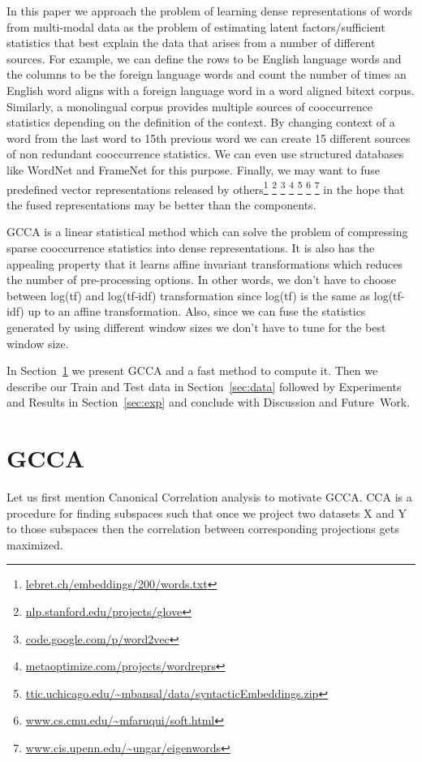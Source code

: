 \documentclass[11pt]{article}
\begin{document}
In this paper we approach the problem of learning dense
representations of words from multi-modal data as the
problem of estimating latent factors/sufficient statistics that best
explain the
data that arises from a number of different
sources. For example, we can define the rows to be English language words
and the columns to be the foreign language words and
count the number of times an English word aligns with a
foreign language word in a word aligned bitext corpus. Similarly,
a monolingual corpus provides multiple sources of 
cooccurrence statistics depending on the definition of the
context. By changing context of a word from the last word to 15th
previous word we can
create 15 different sources of non redundant cooccurrence
statistics. We can even use structured databases like WordNet and
FrameNet for this purpose. Finally, we may want to fuse predefined vector
representations released by others\footnote{\url{lebret.ch/embeddings/200/words.txt}}
  \footnote{\url{nlp.stanford.edu/projects/glove}}
  \footnote{\url{code.google.com/p/word2vec}}
  \footnote{\url{metaoptimize.com/projects/wordreprs}}
  \footnote{\url{ttic.uchicago.edu/~mbansal/data/syntacticEmbeddings.zip}}
  \footnote{\url{www.cs.cmu.edu/~mfaruqui/soft.html}}
  \footnote{\url{www.cis.upenn.edu/~ungar/eigenwords}}
  in the hope that the fused representations may be better
than the components.

GCCA is a linear statistical method which can solve the
problem of compressing sparse cooccurrence statistics into dense representations.
It is also has the appealing property that it
learns affine invariant transformations which reduces the number of
pre-processing options. In other words, we don't have to choose 
between log(tf) and log(tf-idf) transformation since log(tf) is the
same as log(tf-idf) up to an affine transformation. Also, since we can
fuse the statistics generated by using different window sizes we don't
have to tune for the best window size.

In Section~\ref{sec:gcca} we present GCCA and a fast method to
compute it. Then we describe our Train and Test data in
Section~\ref{sec:data} followed by Experiments and Results in
Section~\ref{sec:exp} and conclude with Discussion and Future~Work.  

\section{GCCA}
\label{sec:gcca}
Let us first mention Canonical Correlation analysis to motivate
GCCA. CCA is a procedure for finding subspaces such that once we
project two datasets X and Y to those subspaces then the correlation
between corresponding projections gets
maximized\cite{hotelling1935the}.
\end{document}
